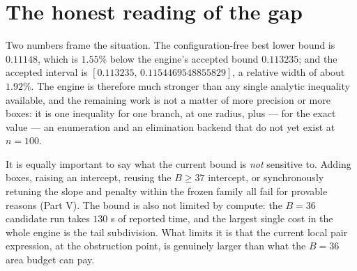 \section{The honest reading of the gap}

Two numbers frame the situation. The configuration-free best lower bound is $0.11148$, which is
$1.55\%$ below the engine's accepted bound $0.113235$; and the accepted interval is
$[0.113235,\,0.1154469548855829]$, a relative width of about $1.92\%$. The engine is therefore much
stronger than any single analytic inequality available, and the remaining work is not a matter of
more precision or more boxes: it is one inequality for one branch, at one radius, plus --- for the
exact value --- an enumeration and an elimination backend that do not yet exist at $n=100$.

It is equally important to say what the current bound is \emph{not} sensitive to. Adding boxes,
raising an intercept, reusing the $B\ge37$ intercept, or synchronously retuning the slope and penalty
within the frozen family all fail for provable reasons (Part V). The bound is also not limited by
compute: the $B=36$ candidate run takes $130$ s of reported time, and the largest single cost in the
whole engine is the tail subdivision. What limits it is that the current local pair expression, at
the obstruction point, is genuinely larger than what the $B=36$ area budget can pay.
